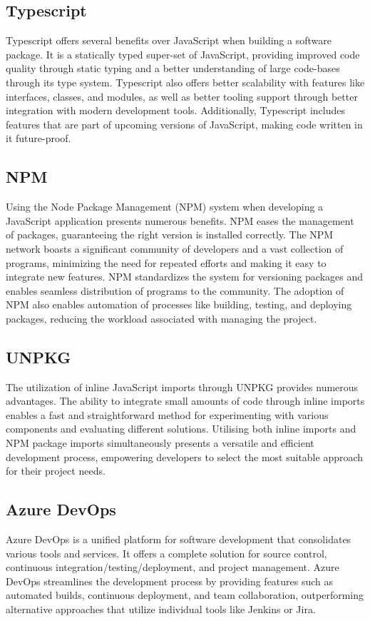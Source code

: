 \documentclass{l4proj}
\begin{document}
\subsection{Typescript}
\text Typescript offers several benefits over JavaScript when building a software package. It is a statically typed super-set of JavaScript, providing improved code quality through static typing and a better understanding of large code-bases through its type system. Typescript also offers better scalability with features like interfaces, classes, and modules, as well as better tooling support through better integration with modern development tools. Additionally, Typescript includes features that are part of upcoming versions of JavaScript, making code written in it future-proof.

\subsection{NPM}
\text Using the Node Package Management (NPM) system when developing a JavaScript application presents numerous benefits. NPM eases the management of packages, guaranteeing the right version is installed correctly. The NPM network boasts a significant community of developers and a vast collection of programs, minimizing the need for repeated efforts and making it easy to integrate new features. NPM standardizes the system for versioning packages and enables seamless distribution of programs to the community. The adoption of NPM also enables automation of processes like building, testing, and deploying packages, reducing the workload associated with managing the project.


\subsection{UNPKG}
\text The utilization of inline JavaScript imports through UNPKG provides numerous advantages. The ability to integrate small amounts of code through inline imports enables a fast and straightforward method for experimenting with various components and evaluating different solutions. Utilising both inline imports and NPM package imports simultaneously presents a versatile and efficient development process, empowering developers to select the most suitable approach for their project needs.

\subsection{Azure DevOps}
\text Azure DevOps is a unified platform for software development that consolidates various tools and services. It offers a complete solution for source control, continuous integration/testing/deployment, and project management. Azure DevOps streamlines the development process by providing features such as automated builds, continuous deployment, and team collaboration, outperforming alternative approaches that utilize individual tools like Jenkins or Jira.
\end{document}
